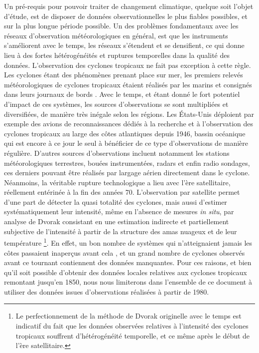 \documentclass[../main.tex]{subfiles}
\begin{document}
Un pré-requis pour pouvoir traiter de changement climatique, quelque soit l'objet d'étude, est de disposer de données observationnelles le plus fiables
possibles, et sur la plus longue période possible. Un des problèmes fondamentaux avec les réseaux d'observation météorologiques en général, est que les
instruments s'améliorent avec le temps, les réseaux s'étendent et se densifient, ce qui donne lieu à des fortes hétérogénéités et ruptures temporelles dans la
qualité des données. L'observation des cyclones tropicaux ne fait pas exception à cette règle. Les cyclones étant des phénomènes prenant place sur mer, les
premiers relevés météorologiques de cyclones tropicaux étaient réalisés par les marins et consignés dans leurs journaux de bords
\parencite{knapp_international_2010}. Avec le temps, et étant donné le fort potentiel d'impact de ces systèmes, les sources d'observations se sont multipliées
et diversifiées, de manière très inégale selon les régions. Les États-Unis déploient par exemple des avions de reconnaissances dédiés à la recherche et à
l'observation des cyclones tropicaux au large des côtes atlantiques depuis \num{1946}, bassin océanique qui est encore à ce jour le seul à bénéficier de ce type
d'observations de manière régulière. D'autres sources d'observations incluent notamment les stations météorologiques terrestres, bouées instrumentées, radars et
enfin radio sondages, ces derniers pouvant être réalisés par largage aérien directement dans le cyclone. Néanmoins, la véritable rupture technologique a lieu
avec l'ère satellitaire, réellement entérinée à la fin des années 70. L'observation par satellite permet d'une part de détecter la quasi totalité des cyclones,
mais aussi d'estimer systématiquement leur intensité, même en l'absence de mesures \textit{in situ}, par analyse de Dvorak consistant en une estimation
indirecte et partiellement subjective de l'intensité à partir de la structure des amas nuageux et de leur température
\parencite{dvorak_tropical_1975,velden_development_1998,olander_development_2002,olander_advanced_2007,olander_advanced_2019}\footnote{Le perfectionnement de la
méthode de Dvorak originelle avec le temps est indicatif du fait que les données observées relatives à l'intensité des cyclones tropicaux souffrent
d'hétérogénéité temporelle, et ce même après le début de l'ère satellitaire.}. En effet, un bon nombre de systèmes qui n'atteignaient jamais les côtes passaient
inaperçus avant cela \parencite{landsea_atlantic_2004}, et un grand nombre de cyclones observés avant ce tournant contiennent des données manquantes. Pour ces
raisons, et bien qu'il soit possible d'obtenir des données locales relatives aux cyclones tropicaux remontant jusqu'en \num{1850}, nous nous limiterons dans
l'ensemble de ce document à utiliser des données issues d'observations réalisées à partir de \num{1980}.
\end{document}
